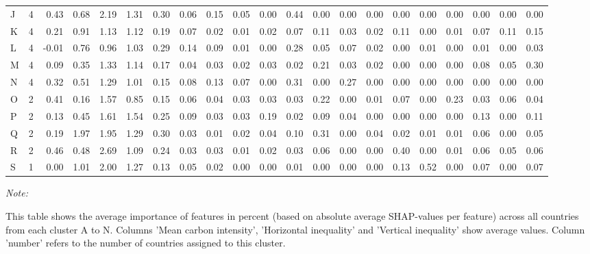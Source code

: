 \begin{table}[H]
{\begin{threeparttable}
\begin{tabular}[t]{lrrrrrrrrrrrrrrrrrrrr}
J & 4 & 0.43 & 0.68 & 2.19 & 1.31 & 0.30 & 0.06 & 0.15 & 0.05 & 0.00 & 0.44 & 0.00 & 0.00 & 0.00 & 0.00 & 0.00 & 0.00 & 0.00 & 0.00 & 0.00\\
K & 4 & 0.21 & 0.91 & 1.13 & 1.12 & 0.19 & 0.07 & 0.02 & 0.01 & 0.02 & 0.07 & 0.11 & 0.03 & 0.02 & 0.11 & 0.00 & 0.01 & 0.07 & 0.11 & 0.15\\
L & 4 & -0.01 & 0.76 & 0.96 & 1.03 & 0.29 & 0.14 & 0.09 & 0.01 & 0.00 & 0.28 & 0.05 & 0.07 & 0.02 & 0.00 & 0.01 & 0.00 & 0.01 & 0.00 & 0.03\\
M & 4 & 0.09 & 0.35 & 1.33 & 1.14 & 0.17 & 0.04 & 0.03 & 0.02 & 0.03 & 0.02 & 0.21 & 0.03 & 0.02 & 0.00 & 0.00 & 0.00 & 0.08 & 0.05 & 0.30\\
N & 4 & 0.32 & 0.51 & 1.29 & 1.01 & 0.15 & 0.08 & 0.13 & 0.07 & 0.00 & 0.31 & 0.00 & 0.27 & 0.00 & 0.00 & 0.00 & 0.00 & 0.00 & 0.00 & 0.00\\
O & 2 & 0.41 & 0.16 & 1.57 & 0.85 & 0.15 & 0.06 & 0.04 & 0.03 & 0.03 & 0.03 & 0.22 & 0.00 & 0.01 & 0.07 & 0.00 & 0.23 & 0.03 & 0.06 & 0.04\\
P & 2 & 0.13 & 0.45 & 1.61 & 1.54 & 0.25 & 0.09 & 0.03 & 0.03 & 0.19 & 0.02 & 0.09 & 0.04 & 0.00 & 0.00 & 0.00 & 0.00 & 0.13 & 0.00 & 0.11\\
Q & 2 & 0.19 & 1.97 & 1.95 & 1.29 & 0.30 & 0.03 & 0.01 & 0.02 & 0.04 & 0.10 & 0.31 & 0.00 & 0.04 & 0.02 & 0.01 & 0.01 & 0.06 & 0.00 & 0.05\\
R & 2 & 0.46 & 0.48 & 2.69 & 1.09 & 0.24 & 0.03 & 0.03 & 0.01 & 0.02 & 0.03 & 0.06 & 0.00 & 0.00 & 0.40 & 0.00 & 0.01 & 0.06 & 0.05 & 0.06\\
S & 1 & 0.00 & 1.01 & 2.00 & 1.27 & 0.13 & 0.05 & 0.02 & 0.00 & 0.00 & 0.01 & 0.00 & 0.00 & 0.00 & 0.13 & 0.52 & 0.00 & 0.07 & 0.00 & 0.07\\
\bottomrule
\end{tabular}
\begin{tablenotes}
\item \textit{Note: } 
\item This table shows the average importance of features in percent (based on absolute average SHAP-values per feature) across all countries from each cluster A to N. Columns 'Mean carbon intensity', 'Horizontal inequality' and 'Vertical inequality' show average values. Column 'number' refers to the number of countries assigned to this cluster.
\end{tablenotes}
\end{threeparttable}}
\end{table}
